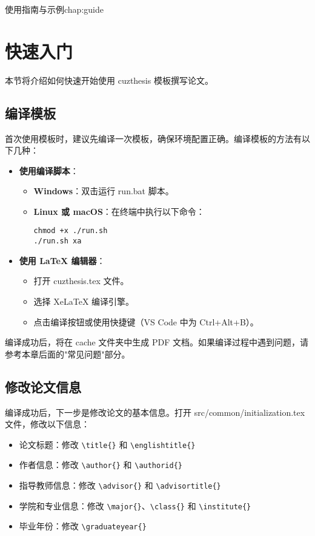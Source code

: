 \begin{cuzchapter}{使用指南与示例}{chap:guide}
	\section{快速入门}\label{sec:quickstart}

	本节将介绍如何快速开始使用 cuzthesis 模板撰写论文。

	\subsection{编译模板}

	首次使用模板时，建议先编译一次模板，确保环境配置正确。编译模板的方法有以下几种：

	\begin{itemize}
		\item \textbf{使用编译脚本}：
		\begin{itemize}
			\item \textbf{Windows}：双击运行 run.bat 脚本。
			\item \textbf{Linux 或 macOS}：在终端中执行以下命令：
			\begin{verbatim}
chmod +x ./run.sh
./run.sh xa
			\end{verbatim}
		\end{itemize}

		\item \textbf{使用 LaTeX 编辑器}：
		\begin{itemize}
			\item 打开 cuzthesis.tex 文件。
			\item 选择 XeLaTeX 编译引擎。
			\item 点击编译按钮或使用快捷键（VS Code 中为 Ctrl+Alt+B）。
		\end{itemize}
	\end{itemize}

	编译成功后，将在 cache 文件夹中生成 PDF 文档。如果编译过程中遇到问题，请参考本章后面的"常见问题"部分。

	\subsection{修改论文信息}

	编译成功后，下一步是修改论文的基本信息。打开 src/common/initialization.tex 文件，修改以下信息：

	\begin{itemize}
		\item 论文标题：修改 \verb|\title{}| 和 \verb|\englishtitle{}|
		\item 作者信息：修改 \verb|\author{}| 和 \verb|\authorid{}|
		\item 指导教师信息：修改 \verb|\advisor{}| 和 \verb|\advisortitle{}|
		\item 学院和专业信息：修改 \verb|\major{}|、\verb|\class{}| 和 \verb|\institute{}|
		\item 毕业年份：修改 \verb|\graduateyear{}|
	\end{itemize}


\end{cuzchapter}
